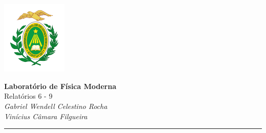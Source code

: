 \documentclass[12pt,a4paper]{article}
\begin{document}
\textcolor{UM_Brown}{
\begin{minipage}{0.1\textwidth}
    \begin{flushleft}
        \includegraphics[height=3.5cm]{Figures/UFRN_Brasao.png}
    \end{flushleft}
\end{minipage}
\begin{minipage}{0.8\textwidth}
    \begin{center}
        \textbf{\Large Laboratório de Física Moderna}\\
        \vspace{5pt}
        Relatórios 6 - 9 \\
        \vspace{20pt}
        \textit{Gabriel Wendell Celestino Rocha} \\
        \vspace{5pt}
        \textit{Vinícius Câmara Filgueira}
    \end{center}
\end{minipage}
\vspace{10pt}
\hrule
}



\end{document}
